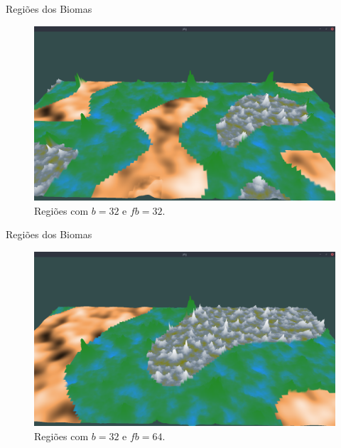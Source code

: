 \begin{frame}{Regiões dos Biomas}
    \begin{figure}[H]
        \centering
        \includegraphics[width=.9\textwidth]{img/re2bfb/fb/32b32.png}
        \caption{Regiões com $b = 32$ e $fb = 32$.}
        \label{fig:img_re2bfb_fb_32b32}
    \end{figure}
    
    
\end{frame}

\begin{frame}{Regiões dos Biomas}
    \begin{figure}[H]
        \centering
        \includegraphics[width=.9\textwidth]{img/re2bfb/fb/64b32.png}
        \caption{Regiões com $b = 32$ e $fb = 64$.}
        \label{fig:img_re2bfb_fb_64b32}
    \end{figure}
    
    
\end{frame}